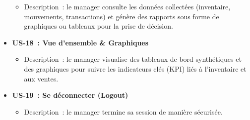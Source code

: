 \documentclass[12pt,a4paper]{report}
\begin{document}
\begin{itemize}
\begin{itemize}
      \item Description : le manager consulte les données collectées (inventaire, mouvements, transactions) et génère des rapports sous forme de graphiques ou tableaux pour la prise de décision.
    \end{itemize}
  \item \textbf{US-18 : Vue d’ensemble \& Graphiques}  
    \begin{itemize}
      \item Description : le manager visualise des tableaux de bord synthétiques et des graphiques pour suivre les indicateurs clés (KPI) liés à l’inventaire et aux ventes.
    \end{itemize}
  \item \textbf{US-19 : Se déconnecter (Logout)}  
    \begin{itemize}
      \item Description : le manager termine sa session de manière sécurisée.
    \end{itemize}
\end{itemize}
\end{document}
